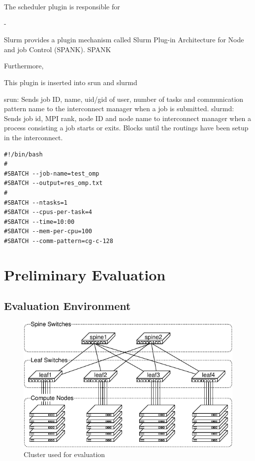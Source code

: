 \documentclass[graybox]{svmult}
\begin{document}
The scheduler plugin is responsible for

-

Slurm provides a plugin mechanism called Slurm Plug-in Architecture for Node
and job Control (SPANK). SPANK

Furthermore,

This plugin is inserted into srun and slurmd

srun: Sends job ID, name, uid/gid of user, number of tasks and communication
pattern name to the interconnect manager when a job is submitted.
slurmd: Sends job id, MPI rank, node ID and node name to interconnect manager
when a process consisting a job starts or exits. Blocks until the routings
have been setup in the interconnect.

\begin{lstlisting}
#!/bin/bash
#
#SBATCH --job-name=test_omp
#SBATCH --output=res_omp.txt
#
#SBATCH --ntasks=1
#SBATCH --cpus-per-task=4
#SBATCH --time=10:00
#SBATCH --mem-per-cpu=100
#SBATCH --comm-pattern=cg-c-128
\end{lstlisting}


\section{Preliminary Evaluation}\label{kt:sec:iv}

\subsection{Evaluation Environment}

\begin{figure}
    \centering
    \includegraphics{evaluation_cluster}
    \caption{Cluster used for evaluation}%
    \label{kt:fig:cluster}
\end{figure}
\end{document}

